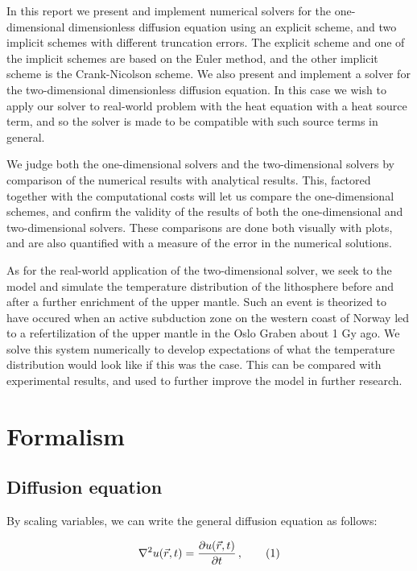 \documentclass[reprint,english,notitlepage]{revtex4-1}  %
\newcommand\numberthis{\addtocounter{equation}{1}\tag{\theequation}}
\begin{document}
In this report we present and implement numerical solvers for the one-dimensional dimensionless diffusion equation using an explicit scheme, and two implicit schemes with different truncation errors. The explicit scheme and one of the implicit schemes are based on the Euler method, and the other implicit scheme is the Crank-Nicolson scheme. We also present and implement a solver for the two-dimensional dimensionless diffusion equation. In this case we wish to apply our solver to real-world problem with the heat equation with a heat source term, and so the solver is made to be compatible with such source terms in general. 

We judge both the one-dimensional solvers and the two-dimensional solvers by comparison of the numerical results with analytical results. This, factored together with the computational costs will let us compare the one-dimensional schemes, and confirm the validity of the results of both the one-dimensional and two-dimensional solvers. These comparisons are done both visually with plots, and are also quantified with a measure of the error in the numerical solutions.

As for the real-world application of the two-dimensional solver, we seek to the model and simulate the temperature distribution of the lithosphere before and after a further enrichment of the upper mantle. Such an event is theorized to have occured when an active subduction zone on the western coast of Norway led to a refertilization of the upper mantle in the Oslo Graben about 1 Gy ago. We solve this system numerically to develop expectations of what the temperature distribution would look like if this was the case. This can be compared with experimental results, and used to further improve the model in further research. 


\newpage

\section{Formalism} \label{sec:formalism}

\subsection{Diffusion equation} \label{sec:formalism_diffusion_equation}

By scaling variables, we can write the general diffusion equation as follows:

\begin{align*}
\nabla^2 u(\vec{r},t) = \frac{\partial u(\vec{r},t)}{\partial t} \, , \numberthis \label{eq:3D_diff_eq}
\end{align*}
\end{document}
